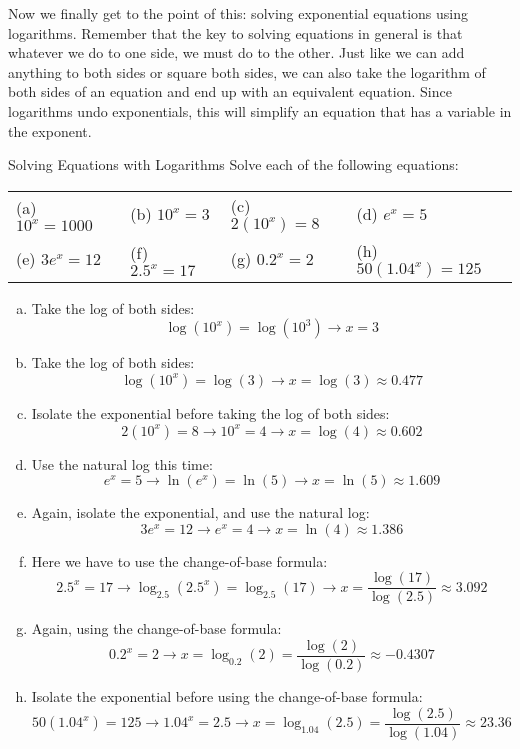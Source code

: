 Now we finally get to the point of this: solving exponential equations using logarithms.  Remember that the key to solving equations in general is that whatever we do to one side, we must do to the other.  Just like we can add anything to both sides or square both sides, we can also take the logarithm of both sides of an equation and end up with an equivalent equation.  Since logarithms undo exponentials, this will simplify an equation that has a variable in the exponent.

\begin{example}[https://www.youtube.com/watch?v=JnA4ypiJB6g]{Solving Equations with Logarithms}
Solve each of the following equations:
\begin{center}
\begin{tabular}{l l l l}
(a) $10^x=1000$ & (b) $10^x=3$ & (c) $2(10^x)=8$ & (d) $e^x=5$\\
(e) $3e^x=12$ & (f) $2.5^x=17$ & (g) $0.2^x=2$ & (h) $50(1.04^x)=125$
\end{tabular}
\end{center}

\begin{enumerate}[(a)]
\item Take the log of both sides: \[\log(10^x) = \log(10^3) \longrightarrow x=3\]
\item Take the log of both sides: \[\log(10^x) = \log(3) \longrightarrow x=\log(3) \approx 0.477\]
\item Isolate the exponential before taking the log of both sides:
\[2(10^x)=8 \longrightarrow 10^x = 4 \longrightarrow x=\log(4) \approx 0.602\]
\item Use the natural log this time:
\[e^x=5 \longrightarrow \ln(e^x) = \ln(5) \longrightarrow x=\ln(5) \approx 1.609\]
\item Again, isolate the exponential, and use the natural log:
\[3e^x = 12 \longrightarrow e^x=4 \longrightarrow x=\ln(4) \approx 1.386\]
\item Here we have to use the change-of-base formula:
\[2.5^x=17 \longrightarrow \log_{2.5}(2.5^x)=\log_{2.5}(17) \longrightarrow x = \dfrac{\log(17)}{\log(2.5)} \approx 3.092\]
\item Again, using the change-of-base formula:
\[0.2^x = 2 \longrightarrow x=\log_{0.2}(2) = \dfrac{\log(2)}{\log(0.2)} \approx -0.4307\]
\item Isolate the exponential before using the change-of-base formula:
\[50(1.04^x) = 125 \longrightarrow 1.04^x = 2.5 \longrightarrow x = \log_{1.04}(2.5) = \dfrac{\log(2.5)}{\log(1.04)} \approx 23.36\]
\end{enumerate}
\end{example}
\pagebreak

